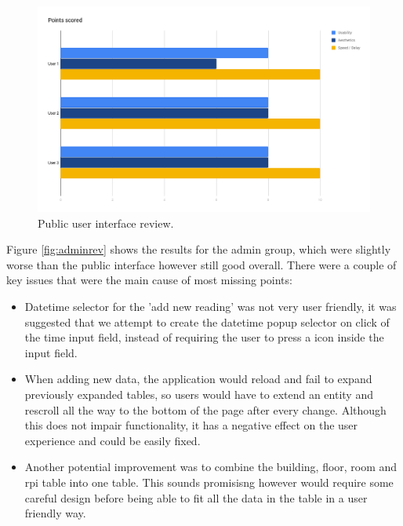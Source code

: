 \documentclass{l4proj}
\begin{document}
\begin{figure}
\centering
\includegraphics[width=\textwidth]{userrev}
\caption{Public user interface review.}
\label{fig:userrev}
\end{figure}

Figure \ref{fig:adminrev} shows the results for the admin group, which were slightly worse than the public interface however still good overall. There were a couple of key issues that were the main cause of most missing points:
\begin{itemize}	
  \item Datetime selector for the 'add new reading' was not very user friendly, it was suggested that we attempt to create the datetime popup selector on click of the time input field, instead of requiring the user to press a icon inside the input field.
  \item When adding new data, the application would reload and fail to expand previously expanded tables, so users would have to extend an entity and rescroll all the way to the bottom of the page after every change. Although this does not impair functionality, it has a negative effect on the user experience and could be easily fixed.
  \item Another potential improvement was to combine the building, floor, room and rpi table into one table. This sounds promisisng however would require some careful design before being able to fit all the data in the table in a user friendly way.


\end{itemize}
	
\end{document}
